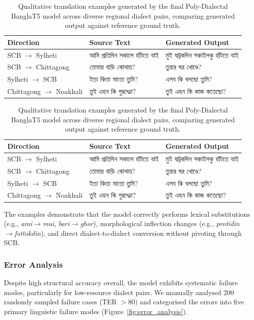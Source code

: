 \documentclass[12pt,a4paper]{article}
\providecommand{\banglafont}{}
\begin{document}
\begin{table}[htbp]
\centering
\caption{Qualitative translation examples generated by the final Poly-Dialectal BanglaT5 model across diverse regional dialect pairs, comparing generated output against reference ground truth.}
\label{tab:qualitative}
\small
\ifXeTeX
\begin{tabular}{@{}l >{\banglafont}p{5.0cm} >{\banglafont}p{5.0cm}@{}}
\toprule
\textbf{Direction} & {\normalfont\bfseries Source Text} & {\normalfont\bfseries Generated Output} \\
\midrule
SCB $\rightarrow$ Sylheti & আমি প্রতিদিন সকালে হাঁটতে যাই & মুই ফট্তকদিন সকাইলকু হাঁটতে যাই \\
\addlinespace
SCB $\rightarrow$ Chittagong & তোমার বাড়ি কোথায়? & তুয়ার ঘর খোণ্ডে? \\
\addlinespace
Sylheti $\rightarrow$ SCB & ইতা কিতা মাতো তুমি? & এসব কি বলছো তুমি? \\
\addlinespace
Chittagong $\rightarrow$ Noakhali & তুই এহন কি গুরদ্দ্যো? & তুই এহন কি কাজ কতেছো? \\
\bottomrule
\end{tabular}
\else
\begin{tabular}{@{}l >{\banglafont}p{5.0cm} >{\banglafont}p{5.0cm}@{}}
\toprule
\textbf{Direction} & \textbf{Source Text} & \textbf{Generated Output} \\
\midrule
SCB $\rightarrow$ Sylheti & আমি প্রতিদিন সকালে হাঁটতে যাই & মুই ফট্তকদিন সকাইলকু হাঁটতে যাই \\
\addlinespace
SCB $\rightarrow$ Chittagong & তোমার বাড়ি কোথায়? & তুয়ার ঘর খোণ্ডে? \\
\addlinespace
Sylheti $\rightarrow$ SCB & ইতা কিতা মাতো তুমি? & এসব কি বলছো তুমি? \\
\addlinespace
Chittagong $\rightarrow$ Noakhali & তুই এহন কি গুরদ্দ্যো? & তুই এহন কি কাজ কতেছো? \\
\bottomrule
\end{tabular}
\fi
\end{table}

The examples demonstrate that the model correctly performs lexical substitutions (e.g., \textit{ami}$\rightarrow$\textit{mui}, \textit{bari}$\rightarrow$\textit{ghor}), morphological inflection changes (e.g., \textit{protidin}$\rightarrow$\textit{fottokdin}), and direct dialect-to-dialect conversion without pivoting through SCB.

\subsubsection{Error Analysis}
Despite high structural accuracy overall, the model exhibits systematic failure modes, particularly for low-resource dialect pairs. We manually analysed 200 randomly sampled failure cases (TER $> 80$) and categorised the errors into five primary linguistic failure modes (Figure~\ref{fig:error_analysis}).
\end{document}
